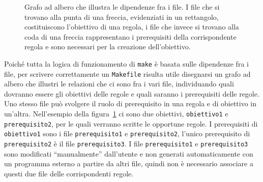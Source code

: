 \begin{figure}
  \centering
  \caption{Grafo ad albero che illustra le dipendenze fra i file.  I file che si
    trovano alla punta di una freccia, evidenziati in un rettangolo,
    costituiscono l'obiettivo di una regola, i file che invece si trovano alla
    coda di una freccia rappresentano i prerequisiti della corrispondente
    regola e sono necessari per la creazione dell'obiettivo.}
  \label{fig:grafo-albero1}
\end{figure}
Poiché tutta la logica di funzionamento di \texttt{make} è basata sulle
dipendenze fra i file, per scrivere correttamente un \texttt{Makefile} risulta
utile disegnarsi un grafo ad albero che illustri le relazioni che ci sono fra i
vari file, individuando quali dovranno essere gli obiettivi delle regole e quali
saranno i prerequisiti delle regole.  Uno stesso file può svolgere il ruolo di
prerequisito in una regola e di obiettivo in un'altra.  Nell'esempio della
figura~\ref{fig:grafo-albero1} ci sono due obiettivi, \texttt{obiettivo1} e
\texttt{prerequisito2}, per le quali verranno scritte le opportune regole.  I
prerequisiti di \texttt{obiettivo1} sono i file \texttt{prerequisito1} e
\texttt{prerequisito2}, l'unico prerequisito di \texttt{prerequisito2} è il file
\texttt{prerequisito3}.  I file \texttt{prerequisito1} e \texttt{prerequisito3}
sono modificati ``manualmente'' dall'utente e non generati automaticamente con
un programma esterno a partire da altri file, quindi non è necessario associare
a questi due file delle corrispondenti regole.

